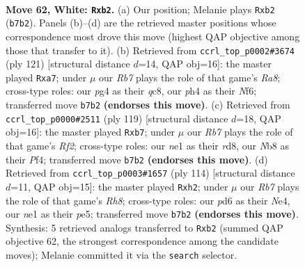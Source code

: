 \documentclass[11pt]{article}
\begin{document}
\clearpage

\begin{figure}[p]\centering
\begin{subfigure}{0.46\textwidth}\centering
\resizebox{\linewidth}{!}{%
\newchessgame
\chessboard[
  setfen={1N6/1R6/3p2k1/8/6pp/8/1p6/4n2K w - - 2 62},
  showmover=false,
  pgfstyle=straightmove, color=movearrow, markmove={b7-b2}
]}
\caption{}
\end{subfigure}\hfill
\begin{subfigure}{0.46\textwidth}\centering
\resizebox{\linewidth}{!}{%
\newchessgame
\chessboard[
  setfen={2Q5/P7/5nk1/8/5P2/4p3/6PK/r7 b - - 0 61},
  showmover=false,
  pgfstyle=straightmove, color=movearrow, markmove={a1-a7}
]}
\caption{}
\end{subfigure}
\\[4pt]
\begin{subfigure}{0.46\textwidth}\centering
\resizebox{\linewidth}{!}{%
\newchessgame
\chessboard[
  setfen={3R4/1P3r2/8/p1k5/5p2/8/2P4P/2K5 b - - 0 60},
  showmover=false,
  pgfstyle=straightmove, color=movearrow, markmove={f7-b7}
]}
\caption{}
\end{subfigure}\hfill
\begin{subfigure}{0.46\textwidth}\centering
\resizebox{\linewidth}{!}{%
\newchessgame
\chessboard[
  setfen={7R/6r1/2k5/p3p3/4N3/3K4/7p/8 w - - 0 58},
  showmover=false,
  pgfstyle=straightmove, color=movearrow, markmove={h8-h2}
]}
\caption{}
\end{subfigure}
\caption{\textbf{Move 62, White: \texttt{Rxb2}.} (a) Our position; Melanie plays \texttt{Rxb2} (\texttt{b7b2}). Panels (b)--(d) are the retrieved master positions whose correspondence most drove this move (highest QAP objective among those that transfer to it). (b) Retrieved from \texttt{ccrl\_top\_p0002\#3674} (ply 121) [structural distance $d$=14, QAP obj=16]: the master played \texttt{Rxa7}; under $\mu$ our \emph{Rb7} plays the role of that game's \emph{Ra8}; cross-type roles: our \emph{p}g4 as their \emph{q}c8, our \emph{p}h4 as their \emph{N}f6; transferred move \texttt{b7b2} \textbf{(endorses this move)}. (c) Retrieved from \texttt{ccrl\_top\_p0000\#2511} (ply 119) [structural distance $d$=18, QAP obj=16]: the master played \texttt{Rxb7}; under $\mu$ our \emph{Rb7} plays the role of that game's \emph{Rf2}; cross-type roles: our \emph{n}e1 as their \emph{r}d8, our \emph{N}b8 as their \emph{P}f4; transferred move \texttt{b7b2} \textbf{(endorses this move)}. (d) Retrieved from \texttt{ccrl\_top\_p0003\#1657} (ply 114) [structural distance $d$=11, QAP obj=15]: the master played \texttt{Rxh2}; under $\mu$ our \emph{Rb7} plays the role of that game's \emph{Rh8}; cross-type roles: our \emph{p}d6 as their \emph{N}e4, our \emph{n}e1 as their \emph{p}e5; transferred move \texttt{b7b2} \textbf{(endorses this move)}. Synthesis: 5 retrieved analogs transferred to \texttt{Rxb2} (summed QAP objective 62, the strongest correspondence among the candidate moves); Melanie committed it via the \texttt{search} selector.}
\label{fig:thought-m122}
\end{figure}
\end{document}
